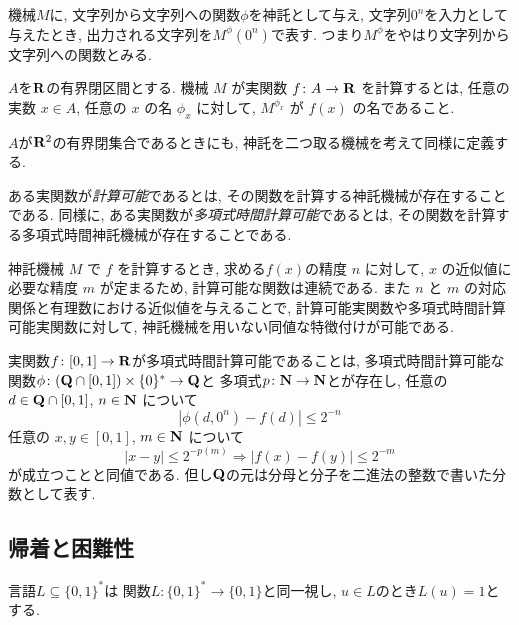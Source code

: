 機械$M$に, 
文字列から文字列への関数$\phi$を神託として与え, 
文字列$0 ^n$を入力として与えたとき, 
出力される文字列を$M ^\phi (0 ^n)$で表す. 
つまり$M ^\phi$をやはり文字列から文字列への関数とみる. 

\begin{definition}
$A$を$\mathbf R$の有界閉区間とする. 
機械 $M$ が実関数 $f \colon A \to \mathbf R$ を計算するとは,
任意の実数 $x \in A$, 任意の $x$ の名 $\phi_x$ に対して,
$M^{\phi_x}$ が $f(x)$ の名であること.
\end{definition}

$A$が$\mathbf R ^2$の有界閉集合であるときにも, 
神託を二つ取る機械を考えて同様に定義する. 

 ある実関数が\emph{計算可能}であるとは, その関数を計算する神託機械が存在することである.
 同様に, ある実関数が\emph{多項式時間計算可能}であるとは, その関数を計算する多項式時間神託機械が存在することである.

 神託機械 $M$ で $f$ を計算するとき, 求める$f (x)$の精度 $n$ に対して,
 $x$ の近似値に必要な精度 $m$ が定まるため,
 計算可能な関数は連続である.
 また $n$ と $m$ の対応関係と有理数における近似値を与えることで,
 計算可能実関数や多項式時間計算可能実関数に対して,
 神託機械を用いない同値な特徴付けが可能である.

\begin{lemma}
  \label{lem:type1representation}
  実関数$f\colon [0,1] \to \mathbf R$が多項式時間計算可能であることは, 
  多項式時間計算可能な
  関数$\phi \colon (\mathbf Q \cap [0, 1]) \times \{0\} ^* \to \mathbf Q$と
  多項式$p \colon \mathbf N \to \mathbf N$とが存在し, 
  任意の $d \in \mathbf Q \cap [0,1]$, $n \in \mathbf N$ について
  \begin{equation}
   |\phi(d, 0^n) - f(d)| \le 2^{-n} 
  \end{equation}
  任意の $x, y \in [0, 1]$, $m \in \mathbf N$ について
  \begin{equation}
   |x-y| \le 2^{-p(m)} \Rightarrow |f(x) - f(y)| \le 2^{-m} 
  \end{equation}
  が成立つことと同値である. 
但し$\mathbf Q$の元は分母と分子を二進法の整数で書いた分数として表す. 
\end{lemma}

\subsection{帰着と困難性}

言語$L \subseteq \{0, 1\} ^*$は
関数$L \colon \{0, 1\} ^* \to \{0, 1\}$と同一視し, 
$u \in L$のとき$L (u) = 1$とする. 

